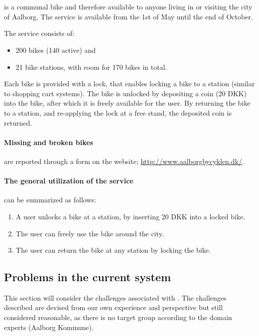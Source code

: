 \section{\citybike}\label{aalborg_bycyklen}
\citybike is a communal bike and therefore available to anyone living in or visiting the city of Aalborg.
The service is available from the 1st of May until the end of October.\cite{aalborgbycyklenbagcyklen}

\noindent The service consists of:
\begin{itemize}
\item 200 bikes (140 active) and 
\item 21 bike stations, with room for 170 bikes in total.
\end{itemize}
Each bike is provided with a lock, that enables locking a bike to a station (similar to shopping cart systems).
The bike is unlocked by depositing a coin (20 DKK) into the bike, after which it is freely available for the user.
By returning the bike to a station, and re-applying the lock at a free stand, the deposited coin is returned.

\paragraph{Missing and broken bikes} are reported through a form on the \citybike website; \url{http://www.aalborgbycyklen.dk/}.

\paragraph{The general utilization of the service} can be summarized as follows:
\begin{enumerate}
\item A user unlocks a bike at a station, by inserting 20 DKK into a locked bike.
\item The user can freely use the bike around the city.
\item The user can return the bike at any station by locking the bike.
\end{enumerate}

\subsection{Problems in the current system} \label{aalborg_bycyklen:challenges}
This section will consider the challenges associated with \citybike.
The challenges described are devised from our own experience and perspective but still considered reasonable, as there is no target group according to the domain experts (Aalborg Kommune).

